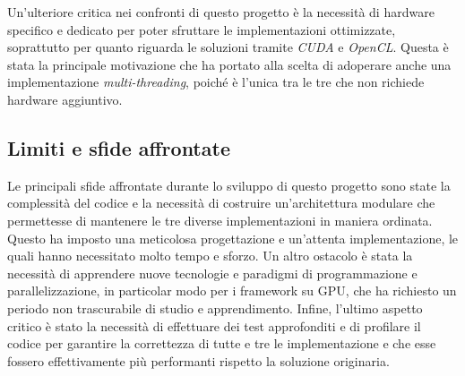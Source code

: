 Un'ulteriore critica nei confronti di questo progetto è la necessità di hardware
specifico e dedicato per poter sfruttare le implementazioni ottimizzate, soprattutto
per quanto riguarda le soluzioni tramite \textit{CUDA} e \textit{OpenCL}. Questa
è stata la principale motivazione che ha portato alla scelta di adoperare anche
una implementazione \textit{multi-threading}, poiché è l'unica tra le tre che
non richiede hardware aggiuntivo.

\subsection{Limiti e sfide affrontate}
\label{subsec:limiti}

Le principali sfide affrontate durante lo sviluppo di questo progetto sono state
la complessità del codice e la necessità di costruire un'architettura modulare che
permettesse di mantenere le tre diverse implementazioni in maniera ordinata.
Questo ha imposto una meticolosa progettazione e un'attenta implementazione, le quali
hanno necessitato molto tempo e sforzo. Un altro ostacolo è stata la necessità
di apprendere nuove tecnologie e paradigmi di programmazione e parallelizzazione,
in particolar modo per i framework su GPU, che ha richiesto un periodo non
trascurabile di studio e apprendimento. Infine, l'ultimo aspetto critico è stato
la necessità di effettuare dei test approfonditi e di profilare il codice per
garantire la correttezza di tutte e tre le implementazione e che esse fossero
effettivamente più performanti rispetto la soluzione originaria.